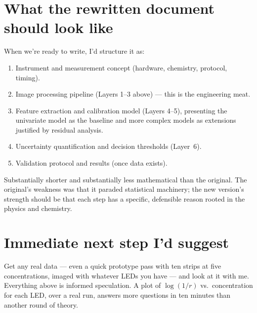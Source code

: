 \documentclass[11pt,letterpaper]{article}
\begin{document}
\section*{What the rewritten document should look like}

When we're ready to write, I'd structure it as:

\begin{enumerate}
  \item Instrument and measurement concept (hardware, chemistry, protocol,
    timing).
  \item Image processing pipeline (Layers 1--3 above) --- this is the
    engineering meat.
  \item Feature extraction and calibration model (Layers 4--5), presenting
    the univariate model as the baseline and more complex models as
    extensions justified by residual analysis.
  \item Uncertainty quantification and decision thresholds (Layer~6).
  \item Validation protocol and results (once data exists).
\end{enumerate}

Substantially shorter and substantially less mathematical than the
original. The original's weakness was that it paraded statistical
machinery; the new version's strength should be that each step has a
specific, defensible reason rooted in the physics and chemistry.

\section*{Immediate next step I'd suggest}

Get any real data --- even a quick prototype pass with ten strips at five
concentrations, imaged with whatever LEDs you have --- and look at it with
me. Everything above is informed speculation. A plot of $\log(1/r)$ vs.\
concentration for each LED, over a real run, answers more questions in ten
minutes than another round of theory.
\end{document}
